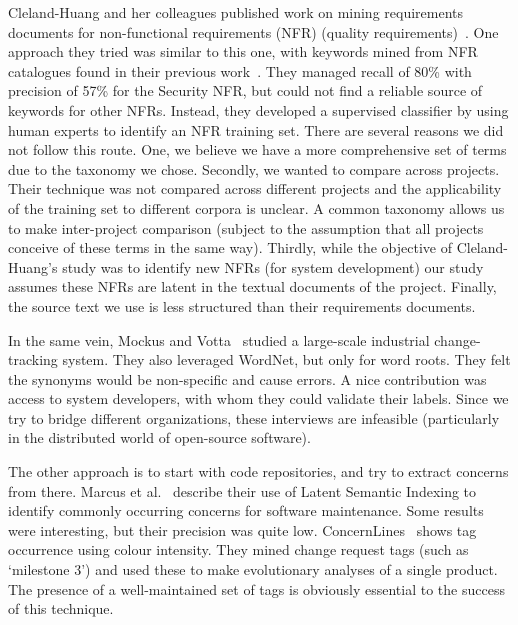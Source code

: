 \documentclass[]{sig-alternate}
\begin{document}
Cleland-Huang and her colleagues published work on mining requirements documents for non-functional requirements (NFR) (quality requirements)~\cite{Cleland-Huang2006}. One approach they tried was similar to this one, with keywords mined from NFR catalogues found in their previous work~\cite{chung99}. They managed recall of 80\% with precision of 57\% for the Security NFR, but could not find a reliable source of keywords for other NFRs. Instead, they developed a supervised classifier by using human experts to identify an NFR training set. There are several reasons we did not follow this route. One, we believe we have a more comprehensive set of terms due to the taxonomy we chose. Secondly, we wanted to compare across projects. Their technique was not compared across different projects and the applicability of the training set to different corpora is unclear. A common taxonomy allows us to make inter-project comparison (subject to the assumption that all projects conceive of these terms in the same way). Thirdly, while the objective of Cleland-Huang's study was to identify new NFRs (for system development) our study assumes these NFRs are latent in the textual documents of the project. Finally, the source text we use is less structured than their requirements documents.

In the same vein, Mockus and Votta~\cite{Mockus00} studied a large-scale industrial change-tracking system. They also leveraged WordNet, but only for word roots. They felt the synonyms would be non-specific and cause errors. A nice contribution was access to system developers, with whom they could validate their labels. Since we try to bridge different organizations, these interviews are infeasible (particularly in the distributed world of open-source software).

The other approach is to start with code repositories, and try to extract concerns from there. Marcus et al.~\cite{marcus04wcre} describe their use of Latent Semantic Indexing to identify commonly occurring concerns for software maintenance. Some results were interesting, but their precision was quite low. ConcernLines~\cite{treude09cl} shows tag occurrence using colour intensity. They mined change request tags (such as `milestone 3') and used these to make evolutionary analyses of a single product. The presence of a well-maintained set of tags is obviously essential to the success of this technique.
\end{document}
